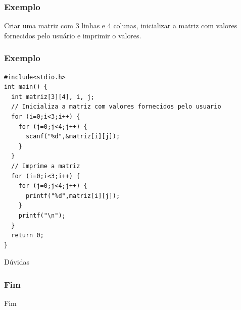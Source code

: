 \documentclass[aspectratio=169]{beamer}
\begin{document}
\begin{frame}
\frametitle{Exemplo}
Criar uma matriz com 3 linhas e 4 colunas, inicializar a matriz com valores fornecidos pelo usuário e imprimir o valores.
\end{frame}


\begin{frame}[fragile]
\frametitle{Exemplo}
\begin{lstlisting}
#include<stdio.h>
int main() {
  int matriz[3][4], i, j;
  // Inicializa a matriz com valores fornecidos pelo usuario
  for (i=0;i<3;i++) {
    for (j=0;j<4;j++) {
      scanf("%d",&matriz[i][j]);
    }
  }
  // Imprime a matriz
  for (i=0;i<3;i++) {
    for (j=0;j<4;j++) {
      printf("%d",matriz[i][j]);
    }
    printf("\n");
  }   
  return 0;
}
\end{lstlisting}

\end{frame}


\begin{frame}
\Huge{\centerline{Dúvidas}}
\end{frame}



\begin{frame}
  \frametitle{Fim}
\begin{center}
\Huge Fim
\end{center}
\end{frame}
\end{document}
